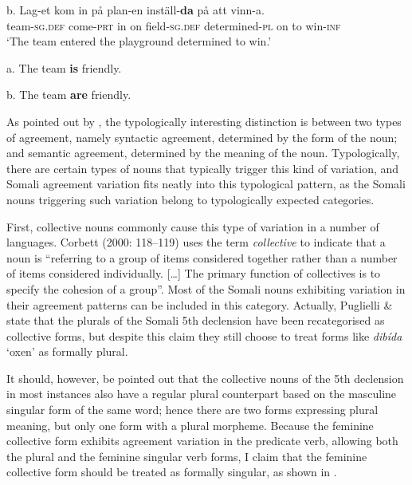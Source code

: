 \documentclass[output=paper]{langsci/langscibook}
\begin{document}
\ex
\gll b.  Lag-et           kom          in på plan-en        inställ-\textbf{da}        på att vinn-a.\\
       team-\textsc{sg.def}  come-\textsc{prt} in on field-\textsc{sg.def} determined-\textsc{pl} on to  win-\textsc{inf} \\
\glt ‘The team entered the playground determined to win.’
\z
\z

\ea a.  The team \textbf{is} friendly.
\z

\ea
 b.  The team \textbf{are} friendly.
\z

As pointed out by \citet[187]{Corbett2000}, the typologically interesting distinction is between two types of agreement, namely syntactic agreement, determined by the form of the noun; and semantic agreement, determined by the meaning of the noun. Typologically, there are certain types of nouns that typically trigger this kind of variation, and Somali agreement variation fits neatly into this typological pattern, as the Somali nouns triggering such variation belong to typologically expected categories.

First, collective nouns commonly cause this type of variation in a number of languages. Corbett (2000: 118–119) uses the term \textit{collective} to indicate that a noun is “referring to a group of items considered together rather than a number of items considered individually. […] The primary function of collectives is to specify the cohesion of a group”. Most of the Somali nouns exhibiting variation in their agreement patterns can be included in this category. Actually, Puglielli \& \citet[82]{Siyaad1984} state that the plurals of the Somali 5th declension have been recategorised as collective forms, but despite this claim they still choose to treat forms like \textit{dibída} ‘oxen’ as formally plural.

It should, however, be pointed out that the collective nouns of the 5th declension in most instances also have a regular plural counterpart based on the masculine singular form of the same word; hence there are two forms expressing plural meaning, but only one form with a plural morpheme. Because the feminine collective form exhibits agreement variation in the predicate verb, allowing both the plural and the feminine singular verb forms, I claim that the feminine collective form should be treated as formally singular, as shown in .
 
\end{document}
